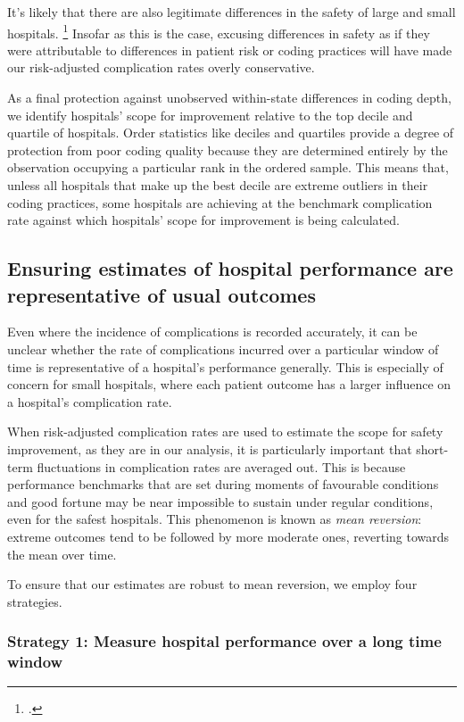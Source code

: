 \documentclass[submission]{grattan}
\begin{document}
It's likely that there are also legitimate differences in the safety of large and small hospitals.%
	\footcite{pieper2013state}
Insofar as this is the case, excusing differences in safety as if they were attributable to differences in patient risk or coding practices will have made our risk-adjusted complication rates overly conservative.

As a final protection against unobserved within-state differences in coding depth, we identify hospitals' scope for improvement relative to the top decile and quartile of hospitals.
Order statistics like deciles and quartiles provide a degree of protection from poor coding quality because they are determined entirely by the observation occupying a particular rank in the ordered sample.
This means that, unless all hospitals that make up the best decile are extreme outliers in their coding practices, some hospitals are achieving at the benchmark complication rate against which hospitals' scope for improvement is being calculated.

\subsection{Ensuring estimates of hospital performance are representative of usual outcomes}\label{subsec:ensuring-estimates-of-hospital-performance-are-representative-of-usual-outcomes}

Even where the incidence of complications is recorded accurately, it can be unclear whether the rate of complications incurred over a particular window of time is representative of a hospital's performance generally.
This is especially of concern for small hospitals, where each patient outcome has a larger influence on a hospital's complication rate.

When risk-adjusted complication rates are used to estimate the scope for safety improvement, as they are in our analysis, it is particularly important that short-term fluctuations in complication rates are averaged out.
This is because performance benchmarks that are set during moments of favourable conditions and good fortune may be near impossible to sustain under regular conditions, even for the safest hospitals.
This phenomenon is known as \emph{mean reversion}: extreme outcomes tend to be followed by more moderate ones, reverting towards the mean over time.

To ensure that our estimates are robust to mean reversion, we employ four strategies.

\subsubsection{Strategy 1: Measure hospital performance over a long time window}\label{subsubsec:strategy-1-measure-hospital-performance-over-a-long-time-window}
\end{document}

